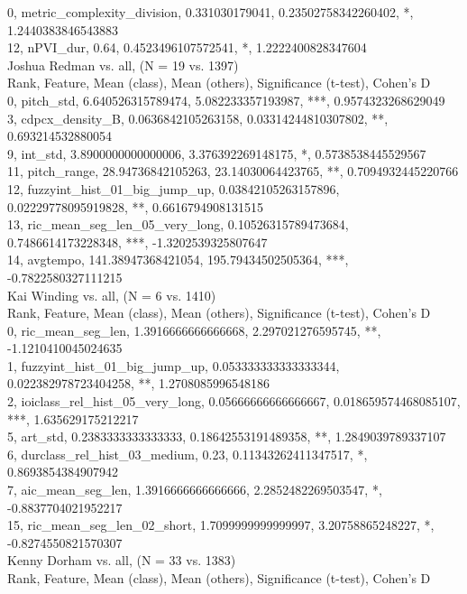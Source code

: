 0, metric_complexity_division, 0.331030179041, 0.23502758342260402, *, 1.2440383846543883\\
12, nPVI_dur, 0.64, 0.4523496107572541, *, 1.2222400828347604\\
Joshua Redman vs. all, (N = 19 vs. 1397)\\
Rank, Feature, Mean (class), Mean (others), Significance (t-test), Cohen's D\\
0, pitch_std, 6.640526315789474, 5.082233357193987, ***, 0.9574323268629049\\
3, cdpcx_density_B, 0.0636842105263158, 0.03314244810307802, **, 0.693214532880054\\
9, int_std, 3.8900000000000006, 3.376392269148175, *, 0.5738538445529567\\
11, pitch_range, 28.94736842105263, 23.14030064423765, **, 0.7094932445220766\\
12, fuzzyint_hist_01_big_jump_up, 0.03842105263157896, 0.02229778095919828, **, 0.6616794908131515\\
13, ric_mean_seg_len_05_very_long, 0.10526315789473684, 0.7486614173228348, ***, -1.3202539325807647\\
14, avgtempo, 141.38947368421054, 195.79434502505364, ***, -0.7822580327111215\\
Kai Winding vs. all, (N = 6 vs. 1410)\\
Rank, Feature, Mean (class), Mean (others), Significance (t-test), Cohen's D\\
0, ric_mean_seg_len, 1.3916666666666668, 2.297021276595745, **, -1.1210410045024635\\
1, fuzzyint_hist_01_big_jump_up, 0.053333333333333344, 0.022382978723404258, **, 1.2708085996548186\\
2, ioiclass_rel_hist_05_very_long, 0.05666666666666667, 0.018659574468085107, ***, 1.635629175212217\\
5, art_std, 0.2383333333333333, 0.18642553191489358, **, 1.2849039789337107\\
6, durclass_rel_hist_03_medium, 0.23, 0.11343262411347517, *, 0.8693854384907942\\
7, aic_mean_seg_len, 1.3916666666666666, 2.2852482269503547, *, -0.8837704021952217\\
15, ric_mean_seg_len_02_short, 1.7099999999999997, 3.20758865248227, *, -0.8274550821570307\\
Kenny Dorham vs. all, (N = 33 vs. 1383)\\
Rank, Feature, Mean (class), Mean (others), Significance (t-test), Cohen's D\\
